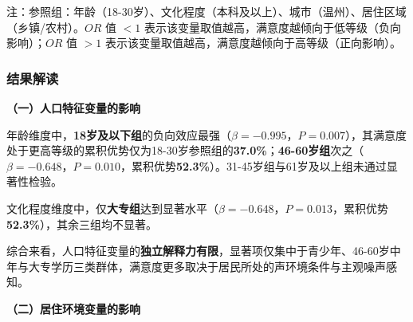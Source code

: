 \begin{table}[H]
\centering
\caption{噪声感知因子的参数估计结果}
\label{tab:params2}
\end{table}

注：参照组：年龄（18-30岁）、文化程度（本科及以上）、城市（温州）、居住区域（乡镇/农村）。$OR$ 值 $<1$ 表示该变量取值越高，满意度越倾向于低等级（负向影响）；$OR$ 值 $>1$ 表示该变量取值越高，满意度越倾向于高等级（正向影响）。

\subsubsection{结果解读}

\textbf{（一）人口特征变量的影响}

年龄维度中，\textbf{18岁及以下组}的负向效应最强（$\beta=-0.995$，$P=0.007$），其满意度处于更高等级的累积优势仅为18-30岁参照组的\textbf{37.0\%}；\textbf{46-60岁组}次之（$\beta=-0.648$，$P=0.010$，累积优势\textbf{52.3\%}）。31-45岁组与61岁及以上组未通过显著性检验。

文化程度维度中，仅\textbf{大专组}达到显著水平（$\beta=-0.648$，$P=0.013$，累积优势\textbf{52.3\%}），其余三组均不显著。

综合来看，人口特征变量的\textbf{独立解释力有限}，显著项仅集中于青少年、46-60岁中年与大专学历三类群体，满意度更多取决于居民所处的声环境条件与主观噪声感知。

\textbf{（二）居住环境变量的影响}

